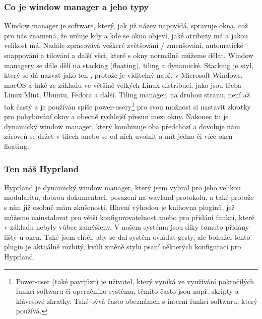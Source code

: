 \documentclass[12pt,a4paper]{article}
\begin{document}
\subsubsection{Co je window manager a jeho typy}
Window manager je software, který, jak již název napovídá, spravuje okna, což pro nás znamená, že určuje kdy a kde se okno objeví, jaké atributy 
má a jakou velikost má. Nadále zpracovává veškeré zvětšování / zmenšování, automatické snappování a tilování a další
věci, které s okny normálně můžeme dělat. Window managery se dále dělí na stacking (floating), tiling a dynamické.
\autocite{WhatTilingWindow}
Stacking je styl, který se dá nazvat jako ten , protože je viditelný např. v Microsoft Windows, macOS a 
také ze základu ve většině velkých Linux distribucí, jako jsou třeba Linux Mint, Ubuntu, Fedora a další. Tiling manager, na druhou
stranu, není až tak častý a je používán spíše power-usery\footnote{Power‑user (také pavrjůzr) je uživatel, který vyniká ve využívání pokročilých
funkcí softwaru či operačního systému, těmito často jsou např. skripty a klávesové zkratky. Také bývá často obeznámen
s interní funkcí softwaru, který používá.} pro svou možnost si nastavit zkratky pro pohybování okny a obecně
rychlejší přesun mezi okny. Nakonec tu je dynamický window manager, který kombinuje oba předchozí a dovoluje nám zároveň
se držet v tilech anebo se od nich uvolnit a mít jedno či více oken floating.

\subsubsection{Ten náš Hyprland}
Hyprland \autocite{HyprlandWiki2026} je dynamický window manager, který jsem vybral pro jeho velikou modularitu, dobrou dokumentaci, posazení na
wayland protokolu, a také protože s ním již osobně mám zkušenosti. Hlavní výhodou je knihovna pluginů, jež můžeme 
nainstalovat pro větší konfigurovatelnost anebo pro přidání funkcí, které v základu nebyly vůbec zamýšleny. V našem
systému jsou díky tomuto přidány lišty u oken. Také jsem chtěl, aby se dal systém ovládat gesty, ale bohužel tento plugin
je aktuálně rozbitý, kvůli změně stylu psaní některých konfigurací pro Hyprland.
\end{document}
